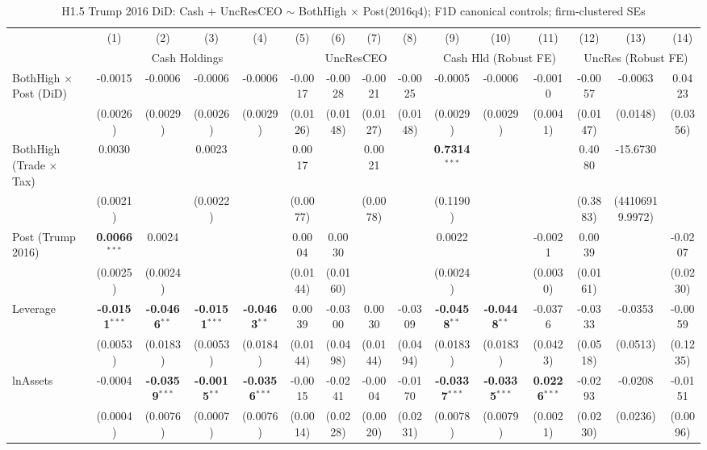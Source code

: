 \documentclass[11pt,a4paper]{article}
\begin{document}
\clearpage
\begin{table}[htbp]
\centering
\caption{H1.5 Trump 2016 DiD: Cash $+$ UncResCEO $\sim$ BothHigh $\times$ Post(2016q4); F1D canonical controls; firm-clustered SEs}
\label{tab:h1_5_trump_did}
\scriptsize
\begin{tabular}{lcccccccccccccc}
\toprule
 & (1) & (2) & (3) & (4) & (5) & (6) & (7) & (8) & (9) & (10) & (11) & (12) & (13) & (14) \\
 & \multicolumn{4}{c}{Cash Holdings} & \multicolumn{4}{c}{UncResCEO} & \multicolumn{3}{c}{Cash Hld (Robust FE)} & \multicolumn{3}{c}{UncRes (Robust FE)} \\
\cmidrule(lr){2-5} \cmidrule(lr){6-9} \cmidrule(lr){10-12} \cmidrule(lr){13-15}
\midrule
BothHigh $\times$ Post (DiD) & -0.0015 & -0.0006 & -0.0006 & -0.0006 & -0.0017 & -0.0028 & -0.0021 & -0.0025 & -0.0005 & -0.0006 & -0.0010 & -0.0057 & -0.0063 & 0.0423 \\
 & (0.0026) & (0.0029) & (0.0026) & (0.0029) & (0.0126) & (0.0148) & (0.0127) & (0.0148) & (0.0029) & (0.0029) & (0.0041) & (0.0147) & (0.0148) & (0.0356) \\
BothHigh (Trade $\times$ Tax) & 0.0030 &  & 0.0023 &  & 0.0017 &  & 0.0021 &  & \textbf{0.7314}$^{***}$ &  &  & 0.4080 & -15.6730 &  \\
 & (0.0021) &  & (0.0022) &  & (0.0077) &  & (0.0078) &  & (0.1190) &  &  & (0.3883) & (44106919.9972) &  \\
Post (Trump 2016) & \textbf{0.0066}$^{***}$ & 0.0024 &  &  & 0.0004 & 0.0030 &  &  & 0.0022 &  & -0.0021 & 0.0039 &  & -0.0207 \\
 & (0.0025) & (0.0024) &  &  & (0.0144) & (0.0160) &  &  & (0.0024) &  & (0.0030) & (0.0161) &  & (0.0230) \\
\midrule
Leverage & \textbf{-0.0151}$^{***}$ & \textbf{-0.0466}$^{**}$ & \textbf{-0.0151}$^{***}$ & \textbf{-0.0463}$^{**}$ & 0.0039 & -0.0300 & 0.0030 & -0.0309 & \textbf{-0.0458}$^{**}$ & \textbf{-0.0448}$^{**}$ & -0.0376 & -0.0333 & -0.0353 & -0.0059 \\
 & (0.0053) & (0.0183) & (0.0053) & (0.0184) & (0.0144) & (0.0498) & (0.0144) & (0.0494) & (0.0183) & (0.0183) & (0.0423) & (0.0518) & (0.0513) & (0.1235) \\
lnAssets & -0.0004 & \textbf{-0.0359}$^{***}$ & \textbf{-0.0015}$^{**}$ & \textbf{-0.0356}$^{***}$ & -0.0015 & -0.0241 & -0.0004 & -0.0170 & \textbf{-0.0337}$^{***}$ & \textbf{-0.0335}$^{***}$ & \textbf{0.0226}$^{***}$ & -0.0293 & -0.0208 & -0.0151 \\
 & (0.0004) & (0.0076) & (0.0007) & (0.0076) & (0.0014) & (0.0228) & (0.0020) & (0.0231) & (0.0078) & (0.0079) & (0.0021) & (0.0230) & (0.0236) & (0.0096) \\

\end{tabular}
\end{table}
\end{document}

